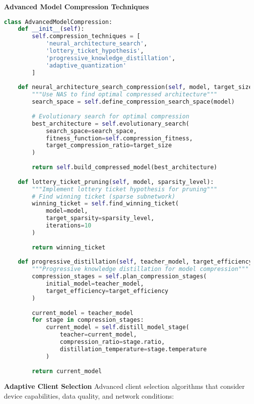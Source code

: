 \textbf{Advanced Model Compression Techniques}
\begin{lstlisting}[language=python, caption=Next-Generation Model Compression]
class AdvancedModelCompression:
    def __init__(self):
        self.compression_techniques = [
            'neural_architecture_search',
            'lottery_ticket_hypothesis',
            'progressive_knowledge_distillation',
            'adaptive_quantization'
        ]
        
    def neural_architecture_search_compression(self, model, target_size):
        """Use NAS to find optimal compressed architecture"""
        search_space = self.define_compression_search_space(model)
        
        # Evolutionary search for optimal compression
        best_architecture = self.evolutionary_search(
            search_space=search_space,
            fitness_function=self.compression_fitness,
            target_compression_ratio=target_size
        )
        
        return self.build_compressed_model(best_architecture)
        
    def lottery_ticket_pruning(self, model, sparsity_level):
        """Implement lottery ticket hypothesis for pruning"""
        # Find winning ticket (sparse subnetwork)
        winning_ticket = self.find_winning_ticket(
            model=model,
            target_sparsity=sparsity_level,
            iterations=10
        )
        
        return winning_ticket
        
    def progressive_distillation(self, teacher_model, target_efficiency):
        """Progressive knowledge distillation for model compression"""
        compression_stages = self.plan_compression_stages(
            initial_model=teacher_model,
            target_efficiency=target_efficiency
        )
        
        current_model = teacher_model
        for stage in compression_stages:
            current_model = self.distill_model_stage(
                teacher=current_model,
                compression_ratio=stage.ratio,
                distillation_temperature=stage.temperature
            )
            
        return current_model
\end{lstlisting}

\textbf{Adaptive Client Selection}
Advanced client selection algorithms that consider device capabilities, data quality, and network conditions:

